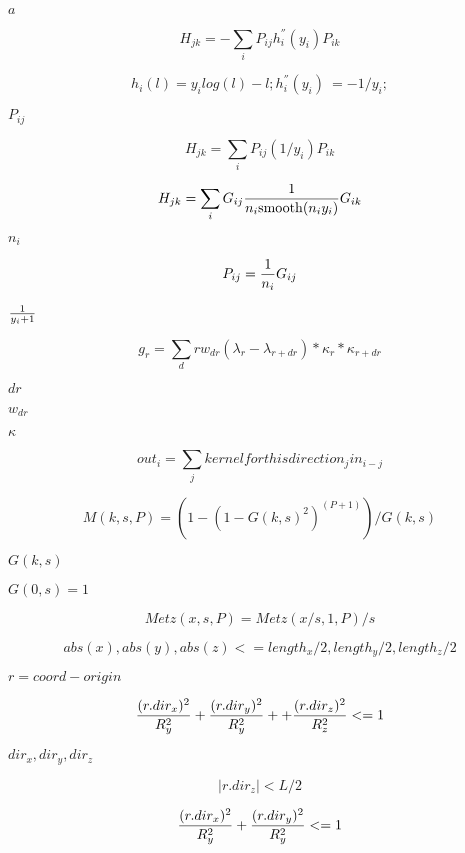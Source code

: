 \documentclass{article}
\begin{document}
$a$
\pagebreak

\[ H_{jk} = - \sum_i P_{ij} h_i^{''}(y_i) P_{ik} \]
\pagebreak

\[ h_i(l) = y_i log (l) - l; h_i^{''}(y_i) ~= -1/y_i; \]
\pagebreak

$P_{ij} $
\pagebreak

\[ H_{jk} = \sum_i P_{ij}(1/y_i) P_{ik} \]
\pagebreak

\[ H_{jk} = \sum_i G_{ij}{1 \over n_i \mathrm{smooth}( n_i y_i)} G_{ik} \]
\pagebreak

$n_i$
\pagebreak

\[ P_{ij} = {1 \over n_i } G_{ij}\]
\pagebreak

$1 \over y_i+1 $
\pagebreak

\[ g_r = \sum_dr w_{dr} (\lambda_r - \lambda_{r+dr}) * \kappa_r * \kappa_{r+dr} \]
\pagebreak

$dr$
\pagebreak

$w_{dr}$
\pagebreak

$\kappa$
\pagebreak

\[ out_i = \sum_j kernelforthisdirection_j in_{i-j} \]
\pagebreak

\[ M(k,s,P) = (1 - (1 - G(k, s)^2)^{(P + 1)})/ G(k, s) \]
\pagebreak

$ G(k,s) $
\pagebreak

$G(0,s) = 1$
\pagebreak

\[ Metz(x,s,P) = Metz(x/s, 1 ,P)/s \]
\pagebreak

\[ abs(x), abs(y), abs(z) <= length_x/2, length_y/2, length_z/2 \]
\pagebreak

$r = coord - origin$
\pagebreak

\[ {(r.dir_x)^2 \over R_y^2} + {(r.dir_y)^2 \over R_y^2}+ + {(r.dir_z)^2 \over R_z^2} <= 1 \]
\pagebreak

$dir_x, dir_y, dir_z$
\pagebreak

\[ |r.dir_z|<L/2 \]
\pagebreak

\[ {(r.dir_x)^2 \over R_y^2} + {(r.dir_y)^2 \over R_y^2} <= 1 \]
\pagebreak
\end{document}
